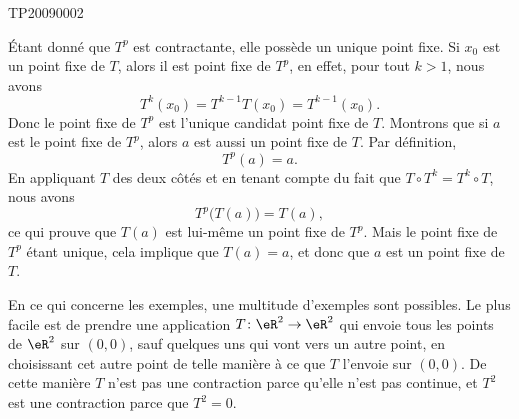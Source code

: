 
\begin{corrige}{TP20090002}

	Étant donné que $T^p$ est contractante, elle possède un unique point fixe. Si $x_0$ est un point fixe de $T$, alors il est point fixe de $T^p$, en effet, pour tout $k>1$, nous avons
	\begin{equation}
		T^k(x_0)=T^{k-1}T(x_0)=T^{k-1}(x_0).
	\end{equation}
	Donc le point fixe de $T^p$ est l'unique candidat point fixe de $T$. Montrons que si $a$ est le point fixe de $T^p$, alors $a$ est aussi un point fixe de $T$. Par définition,
	\begin{equation}
		T^p(a)=a.
	\end{equation}
	En appliquant $T$ des deux côtés et en tenant compte du fait que $T\circ T^k=T^k\circ T$, nous avons
	\begin{equation}
		T^p\big( T(a) \big)=T(a),
	\end{equation}
	ce qui prouve que $T(a)$ est lui-même un point fixe de $T^p$. Mais le point fixe de $T^p$ étant unique, cela implique que $T(a)=a$, et donc que $a$ est un point fixe de $T$.

	En ce qui concerne les exemples, une multitude d'exemples sont possibles. Le plus facile est de prendre une application $T\colon \eR^2\to \eR^2$ qui envoie tous les points de $\eR^2$ sur $(0,0)$, sauf quelques uns qui vont vers un autre point, en choisissant cet autre point de telle manière à ce que $T$ l'envoie sur $(0,0)$. De cette manière $T$ n'est pas une contraction parce qu'elle n'est pas continue, et $T^2$ est une contraction parce que $T^2=0$.

\end{corrige}
